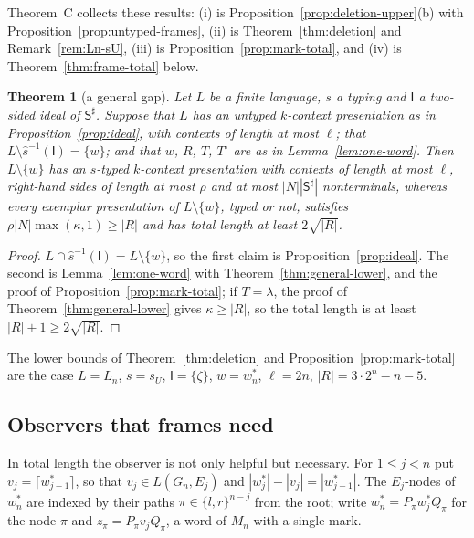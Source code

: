\documentclass[11pt]{article}
\numberwithin{equation}{section}
\theoremstyle{plain}
\newtheorem{theorem}{Theorem}[section]
\theoremstyle{definition}
\theoremstyle{remark}
\theoremstyle{plain}
\newcommand{\eps}{\lambda}
\newcommand{\Lce}{\lceil}
\newcommand{\Rce}{\rceil}
\begin{document}
Theorem~C collects these results: (i) is
Proposition~\ref{prop:deletion-upper}(b) with Proposition~\ref{prop:untyped-frames},
(ii) is Theorem~\ref{thm:deletion} and Remark~\ref{rem:Ln-sU}, (iii) is
Proposition~\ref{prop:mark-total}, and (iv) is Theorem~\ref{thm:frame-total}
below.

\begin{theorem}[a general gap]\label{thm:general-gap}
Let $L$ be a finite language, $s$ a typing and $\mathsf I$ a two-sided ideal
of $\mathsf S^\sharp$.  Suppose that $L$ has an untyped $k$-context
presentation as in Proposition~\ref{prop:ideal}, with contexts of length at
most $\ell$; that $L\setminus\widehat s^{-1}(\mathsf I)=\{w\}$; and that $w$, $R$,
$T$, $T^\circ$ are as in Lemma~\ref{lem:one-word}.  Then $L\setminus\{w\}$ has an
$s$-typed $k$-context presentation with contexts of length at most $\ell$,
right-hand sides of length at most $\rho$ and at most $|N||\mathsf S^\sharp|$
nonterminals, whereas every
exemplar presentation of $L\setminus\{w\}$, typed or not, satisfies $\rho|N|\max(\kappa,1)\ge|R|$ and has total length at
least $2\sqrt{|R|}$.
\end{theorem}
\begin{proof}
$L\cap\widehat s^{-1}(\mathsf I)=L\setminus\{w\}$, so the first claim is
Proposition~\ref{prop:ideal}.  The second is Lemma~\ref{lem:one-word} with
Theorem~\ref{thm:general-lower}, and the proof of Proposition~\ref{prop:mark-total}; if $T=\eps$,
the proof of Theorem~\ref{thm:general-lower} gives $\kappa\ge|R|$, so the
total length is at least $|R|+1\ge2\sqrt{|R|}$.
\end{proof}
The lower bounds of Theorem~\ref{thm:deletion} and
Proposition~\ref{prop:mark-total} are the case $L=L_n$, $s=s_U$,
$\mathsf I=\{\zeta\}$, $w=w^*_n$, $\ell=2n$, $|R|=3\cdot2^n-n-5$.

\subsection*{Observers that frames need}
In total length the observer is not only helpful but necessary.  For
$1\le j<n$ put $v_j=\Lce w^*_{j-1}\Rce$, so that $v_j\in L(G_n,E_j)$ and
$|w^*_j|-|v_j|=|w^*_{j-1}|$.  The $E_j$-nodes of $w^*_n$ are indexed by their
paths $\pi\in\{l,r\}^{n-j}$ from the root; write $w^*_n=P_\pi w^*_jQ_\pi$ for
the node $\pi$ and $z_\pi=P_\pi v_jQ_\pi$, a word of $M_n$ with a single mark.
\end{document}
